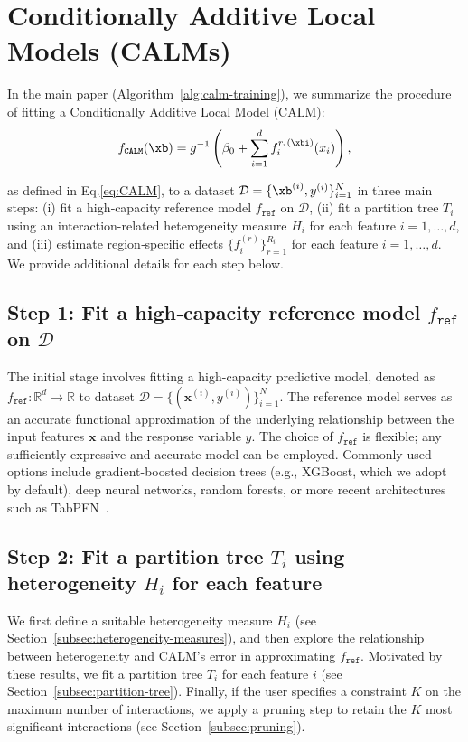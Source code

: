\section{Conditionally Additive Local Models (CALMs)}
\label{app:learning-rams}

In the main paper (Algorithm~\ref{alg:calm-training}), we summarize the procedure of fitting a Conditionally Additive Local Model (CALM):
\[
f_{\texttt{CALM}}(\xb) = g^{-1} \left (  \beta_0 + \sum_{i=1}^d f_i^{r_i(\xbi)}(x_i) \right ),
\]

as defined in Eq.\eqref{eq:CALM}, to a dataset $\mathcal{D} = \{\xb^{(i)}, y^{(i)}\}_{i=1}^N$ in three main steps: (i) fit a high‑capacity reference model \(f_{\mathtt{ref}}\) on $\mathcal{D}$, (ii) fit a partition tree $T_i$  using an interaction-related heterogeneity measure $H_i$ for each feature \(i = 1, \ldots,d\), and (iii) estimate region‑specific effects \( \{ f_i^{(r)} \}_{r=1}^{R_i} \) for each feature \(i = 1, \ldots,d\).
We provide additional details for each step below.

\subsection{Step 1: Fit a high‑capacity reference model \(f_{\mathtt{ref}}\) on $\mathcal{D}$}

The initial stage involves fitting a high-capacity predictive model, denoted as \(f_{\mathtt{ref}}: \mathbb{R}^d \rightarrow \mathbb{R}\) to dataset \(\mathcal{D} = \{(\mathbf{x}^{(i)}, y^{(i)})\}_{i=1}^N\). 
The reference model serves as an accurate functional approximation of the underlying relationship between the input features \(\mathbf{x}\) and the response variable \(y\).
The choice of \(f_{\mathtt{ref}}\) is flexible; any sufficiently expressive and accurate model can be employed. Commonly used options include gradient-boosted decision trees (e.g., XGBoost, which we adopt by default), deep neural networks, random forests, or more recent architectures such as TabPFN~\cite{hollmann2022tabpfn}. 

\subsection{Step 2: Fit a partition tree $T_i$ using heterogeneity $H_i$ for each feature}

We first define a suitable heterogeneity measure $H_i$ (see Section~\ref{subsec:heterogeneity-measures}), and then explore the relationship between heterogeneity and CALM's error in approximating $f_{\texttt{ref}}$. Motivated by these results, we fit a partition tree \(T_i\) for each feature \(i\) (see Section~\ref{subsec:partition-tree}). 
Finally, if the user specifies a constraint \(K\) on the maximum number of interactions, we apply a pruning step to retain the \(K\) most significant interactions (see Section~\ref{subsec:pruning}).

